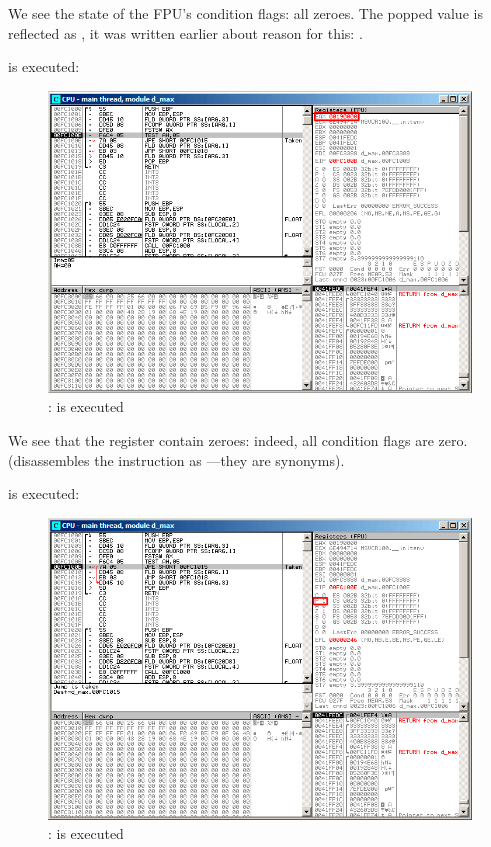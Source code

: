 We see the state of the \ac{FPU}'s condition flags: all zeroes.
The popped value is reflected as , it was written earlier about reason for this: 
.

\clearpage
\FNSTSW is executed:
\begin{figure}[H]
\centering
\includegraphics[scale=\FigScale]{patterns/12_FPU/3_comparison/x86/MSVC/olly1_3.png}
\caption{\olly: \FNSTSW is executed}
\label{fig:FPU_comparison_case1_olly3}
\end{figure}

We see that the  register contain zeroes: indeed, all condition flags are zero.
(\olly disassembles the \FNSTSW instruction as ---they are synonyms).

\clearpage
\TEST is executed:

\begin{figure}[H]
\centering
\includegraphics[scale=\FigScale]{patterns/12_FPU/3_comparison/x86/MSVC/olly1_4.png}
\caption{\olly: \TEST is executed}
\label{fig:FPU_comparison_case1_olly4}
\end{figure}

